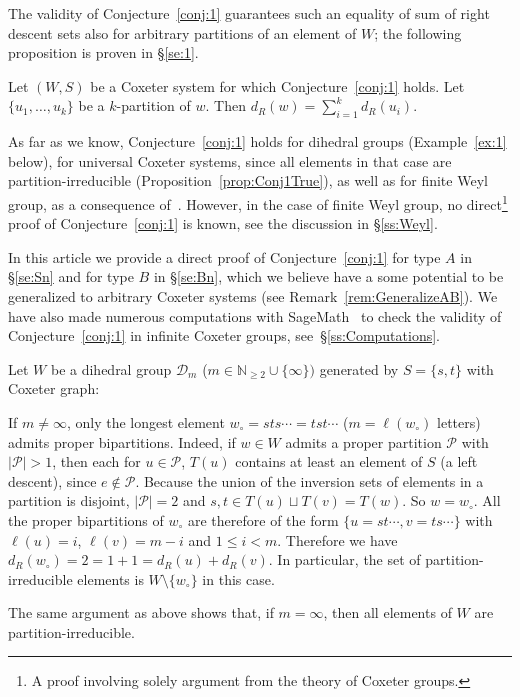 \documentclass[ALCO,Unicode]{cedram}
\theoremstyle{definition}
\begin{document}
The validity of Conjecture~\ref{conj:1} guarantees such an equality of sum of right descent sets also for arbitrary partitions of an element of $W$; the following proposition  is proven in \S\ref{se:1}.

\begin{prop}\label{prop:Conj} Let $(W,S)$ be a Coxeter system for which Conjecture~\ref{conj:1} holds. Let $\{u_1,\dots,u_k\}$ be a $k$-partition of $w$. Then $d_R(w)=\sum_{i=1}^k d_R(u_i)$.
\end{prop}

As far as we know, Conjecture~\ref{conj:1} holds for dihedral groups (Example~\ref{ex:1} below), for universal Coxeter systems, since all elements in that case are partition-irreducible  (Proposition~\ref{prop:Conj1True}), as well as for finite Weyl group, as a consequence of~\cite{FrRe23}. However, in the case of finite Weyl group, no direct\footnote{A proof involving solely argument from the theory of Coxeter groups.} proof of Conjecture~\ref{conj:1} is known, see the discussion in \S\ref{ss:Weyl}.  

 In this article we provide a direct proof of Conjecture~\ref{conj:1} for type $A$ in \S\ref{se:Sn} and for type $B$ in \S\ref{se:Bn}, which we believe have a some potential to be generalized to arbitrary Coxeter systems (see Remark~\ref{rem:GeneralizeAB}).  We have also made numerous computations with SageMath~\cite{sage} to check the validity of Conjecture~\ref{conj:1} in infinite Coxeter groups, see~\S\ref{ss:Computations}. 

\begin{ex}\label{ex:1}  Let $W$ be a dihedral group $\mathcal D_m$ ($m\in\mathbb N_{\geq 2}\cup\{\infty\})$ generated by $S=\{s,t\}$ with Coxeter graph:
\begin{center}
\end{center}
If $m\not=\infty$, only the longest element $w_\circ = sts\cdots=tst\cdots$ ($m=\ell(w_\circ)$ letters)  admits proper bipartitions. Indeed, if $w\in W$ admits a proper partition $\mathcal P$ with $|\mathcal P|>1$, then each for $u\in\mathcal P$, $T(u)$ contains at least an element of $S$ (a left descent), since $e\not\in \mathcal P$. Because the union of the inversion sets of elements in a partition is disjoint,   $|\mathcal P|=2$ and $s,t\in T(u)\sqcup T(v)=T(w)$. So $w=w_\circ$.  All the proper bipartitions of $w_\circ$ are therefore of the form $\{u=st\cdots, v=ts\cdots\}$ with $\ell(u)=i$, $\ell(v)=m-i$ and $1\leq i<m$.   Therefore we have $d_R(w_\circ)=2=1+1=d_R(u)+d_R(v)$.
In particular, the set of partition-irreducible elements is $W\setminus\{w_\circ\}$ in this case.

The same argument as above shows that, if $m=\infty$, then all elements of $W$ are partition-irreducible. 
\end{ex}
\end{document}
